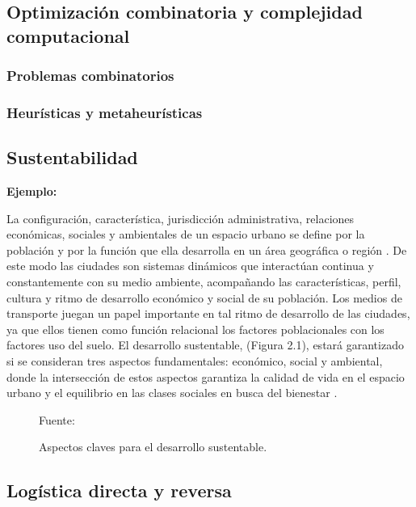 \subsection{Optimización combinatoria y complejidad computacional}
\subsubsection{Problemas combinatorios}
\subsubsection{Heurísticas y metaheurísticas}

\subsection{Sustentabilidad}

{\bf Ejemplo:}\par

La configuración, característica, jurisdicción administrativa, relaciones económicas, sociales y ambientales de un espacio urbano se define por la población y por la función que ella desarrolla en un área geográfica o región \citep{Bugliarello}. De este modo las ciudades son sistemas dinámicos que interactúan continua y constantemente con su medio ambiente, acompañando las características, perfil, cultura y ritmo de desarrollo económico y social de su población. Los medios de transporte juegan un papel importante en tal ritmo de desarrollo de las ciudades, ya que ellos tienen como función relacional los factores poblacionales con los factores uso del suelo.  
\vskip 1cm
El desarrollo sustentable, (Figura 2.1), estará garantizado si se consideran tres aspectos fundamentales: económico, social y ambiental, donde la intersección de estos aspectos garantiza la calidad de vida en el espacio urbano y el equilibrio en las clases sociales en busca del bienestar \citep{Tanguay}.

\begin{figure}[ht]
\begin{center}
\end{center}
\begin{center}
\vskip -0.5cm
\caption{\small{Aspectos claves para el desarrollo sustentable.}}
{\small{Fuente: \cite{Tanguay}}}
\end{center}
\end{figure}

\subsection{Logística directa y reversa}

